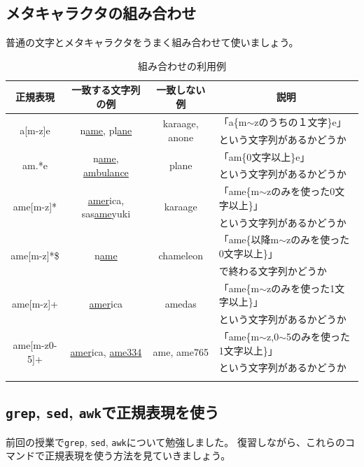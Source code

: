 \documentclass[a4j]{ltjreport}
\newcommand{\cn}[1]{\multirow{2}{*}{#1}}
\begin{document}
    \newpage
    \subsection{メタキャラクタの組み合わせ}
    普通の文字とメタキャラクタをうまく組み合わせて使いましょう。

    \begin{longtable}[c]{|c|c|c|l|}
        \hline
        \multicolumn{1}{|c|}{\textbf{正規表現}}&\multicolumn{1}{|c|}{\textbf{一致する文字列の例}}&\multicolumn{1}{|c|}{\textbf{一致しない例}}&\multicolumn{1}{|c|}{\textbf{説明}}\\
        \hline\hline
        \cn{a[m-z]e} & \cn{n\underline{ame}, pl\underline{ane}}& \cn{karaage, anone} &「a\{m$\sim$zのうちの１文字\}e」\\
        &&&という文字列があるかどうか\\
        \hline
        \cn{am.*e} & \cn{n\underline{ame}, \underline{ambulance}} &  \cn{plane} & 「am\{0文字以上\}e」\\
        &&&という文字列があるかどうか\\
        \hline
        \cn{ame[m-z]*} & \cn{\underline{amer}ica, sas\underline{ame}yuki} & \cn{karaage} & 「ame\{m$\sim$zのみを使った0文字以上\}」\\
        &&&という文字列があるかどうか\\
        \hline
        \cn{ame[m-z]*\$} & \cn{n\underline{ame}} & \cn{chameleon} &「ame\{以降m$\sim$zのみを使った0文字以上\}」\\
        &&&で終わる文字列かどうか\\
        \hline
        \cn{ame[m-z]+}& \cn{\underline{amer}ica} & \cn{amedas} &「ame\{m$\sim$zのみを使った1文字以上\}」\\
        &&&という文字列があるかどうか\\
        \hline
        \cn{ame[m-z0-5]+} & \cn{\underline{amer}ica, \underline{ame334}} & \cn{ame, ame765} &「ame\{m$\sim$z,0$\sim$5のみを使った1文字以上\}」\\
        &&&という文字列があるかどうか\\
        \hline
        \caption{組み合わせの利用例}
    \end{longtable}

    \newpage
    \subsection{\texttt{grep}, \texttt{sed}, \texttt{awk}で正規表現を使う}
    前回の授業で\texttt{grep}, \texttt{sed}, \texttt{awk}について勉強しました。
    復習しながら、これらのコマンドで正規表現を使う方法を見ていきましょう。
\end{document}
